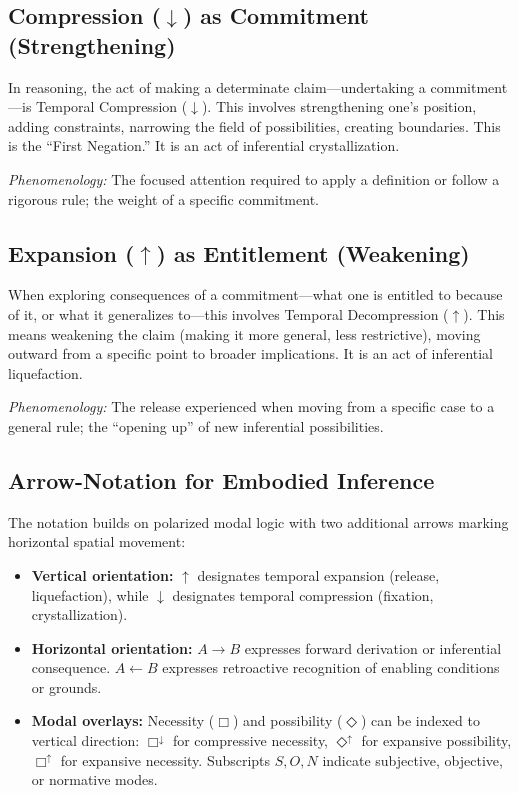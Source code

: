\documentclass[12pt]{book}
\begin{document}
\subsection{Compression ($\downarrow$) as Commitment (Strengthening)}

In reasoning, the act of making a determinate claim---undertaking a commitment---is Temporal Compression ($\downarrow$). This involves strengthening one's position, adding constraints, narrowing the field of possibilities, creating boundaries. This is the ``First Negation.'' It is an act of inferential crystallization.

\textit{Phenomenology:} The focused attention required to apply a definition or follow a rigorous rule; the weight of a specific commitment.

\subsection{Expansion ($\uparrow$) as Entitlement (Weakening)}

When exploring consequences of a commitment---what one is entitled to because of it, or what it generalizes to---this involves Temporal Decompression ($\uparrow$). This means weakening the claim (making it more general, less restrictive), moving outward from a specific point to broader implications. It is an act of inferential liquefaction.

\textit{Phenomenology:} The release experienced when moving from a specific case to a general rule; the ``opening up'' of new inferential possibilities.

\subsection{Arrow-Notation for Embodied Inference}

The notation builds on polarized modal logic with two additional arrows marking horizontal spatial movement:

\begin{itemize}
  \item \textbf{Vertical orientation:} $\uparrow$ designates temporal expansion (release, liquefaction), while $\downarrow$ designates temporal compression (fixation, crystallization).
  \item \textbf{Horizontal orientation:} $A \rightarrow B$ expresses forward derivation or inferential consequence. $A \leftarrow B$ expresses retroactive recognition of enabling conditions or grounds.
  \item \textbf{Modal overlays:} Necessity ($\Box$) and possibility ($\Diamond$) can be indexed to vertical direction: $\Box^{\downarrow}$ for compressive necessity, $\Diamond^{\uparrow}$ for expansive possibility, $\Box^{\uparrow}$ for expansive necessity. Subscripts $S,O,N$ indicate subjective, objective, or normative modes.
\end{itemize}
\end{document}
